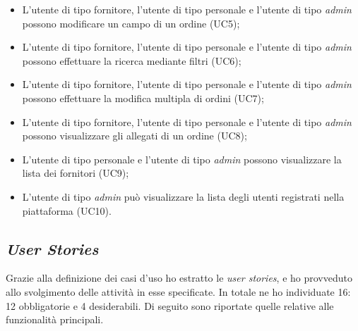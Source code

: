 \begin{itemize}
\begin{itemize}
      \item L'utente di tipo fornitore, l'utente di tipo personale e l'utente di tipo \emph{admin} possono modificare un campo di un ordine (UC5);
      \item L'utente di tipo fornitore, l'utente di tipo personale e l'utente di tipo \emph{admin} possono effettuare la ricerca mediante filtri (UC6);
      \item L'utente di tipo fornitore, l'utente di tipo personale e l'utente di tipo \emph{admin} possono effettuare la modifica multipla di ordini (UC7);
      \item L'utente di tipo fornitore, l'utente di tipo personale e l'utente di tipo \emph{admin} possono visualizzare gli allegati di un ordine (UC8);
      \item L'utente di tipo personale e l'utente di tipo \emph{admin} possono visualizzare la lista dei fornitori (UC9);
      \item L'utente di tipo \emph{admin} può visualizzare la lista degli utenti registrati nella piattaforma (UC10).
    \end{itemize}
\end{itemize}

\subsection{\emph{User Stories}}
Grazie alla definizione dei casi d'uso ho estratto le \emph{user stories}, e ho provveduto allo svolgimento delle attività in esse specificate. 
In totale ne ho individuate 16: 12 obbligatorie e 4 desiderabili.
Di seguito sono riportate quelle relative alle funzionalità principali.

